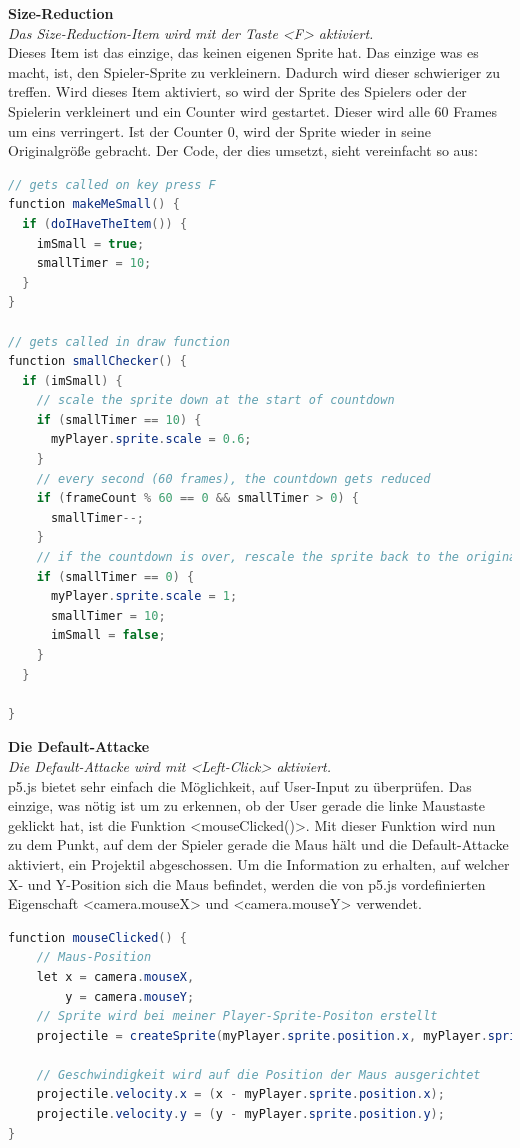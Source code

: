 \textbf{Size-Reduction}
\\
\textit{Das Size-Reduction-Item wird mit der Taste <F> aktiviert.}
\\
Dieses Item ist das einzige, das keinen eigenen Sprite hat. Das einzige was es macht, ist, den Spieler-Sprite zu verkleinern. Dadurch wird dieser schwieriger zu treffen.
Wird dieses Item aktiviert, so wird der Sprite des Spielers oder der Spielerin verkleinert und ein Counter wird gestartet. Dieser wird alle 60 Frames um eins verringert. Ist der Counter 0, wird der Sprite wieder in seine Originalgröße gebracht.
Der Code, der dies umsetzt, sieht vereinfacht so aus:
\\
\begin{lstlisting}[caption=Size-Reduction,language=Java,label=lst:impl:sizeReduc]
// gets called on key press F
function makeMeSmall() {
  if (doIHaveTheItem()) {
    imSmall = true;
    smallTimer = 10;
  }
}

// gets called in draw function
function smallChecker() {
  if (imSmall) {
    // scale the sprite down at the start of countdown
    if (smallTimer == 10) {
      myPlayer.sprite.scale = 0.6;
    }
    // every second (60 frames), the countdown gets reduced
    if (frameCount % 60 == 0 && smallTimer > 0) {
      smallTimer--;
    }
    // if the countdown is over, rescale the sprite back to the original form
    if (smallTimer == 0) {
      myPlayer.sprite.scale = 1;
      smallTimer = 10;
      imSmall = false;
    }
  }

}
\end{lstlisting}

\textbf{Die Default-Attacke}
\\
\textit{Die Default-Attacke wird mit <Left-Click> aktiviert.}
\\
p5.js bietet sehr einfach die Möglichkeit, auf User-Input zu überprüfen. Das einzige, was nötig ist um zu erkennen, ob der User gerade die linke Maustaste geklickt hat, ist die Funktion <mouseClicked()>.
Mit dieser Funktion wird nun zu dem Punkt, auf dem der Spieler gerade die Maus hält und die Default-Attacke aktiviert, ein Projektil abgeschossen. Um die Information zu erhalten, auf welcher X- und Y-Position sich die Maus befindet,
werden die von p5.js vordefinierten Eigenschaft <camera.mouseX> und <camera.mouseY> verwendet.
\\
\begin{lstlisting}[caption=Default-Attacke,language=Java,label=lst:impl:defaultAttack]
    function mouseClicked() {
    // Maus-Position
    let x = camera.mouseX,
        y = camera.mouseY;
    // Sprite wird bei meiner Player-Sprite-Positon erstellt
    projectile = createSprite(myPlayer.sprite.position.x, myPlayer.sprite.position.y, pixelWidth, pixelWidth);
      
    // Geschwindigkeit wird auf die Position der Maus ausgerichtet
    projectile.velocity.x = (x - myPlayer.sprite.position.x);
    projectile.velocity.y = (y - myPlayer.sprite.position.y);
}

\end{lstlisting}

